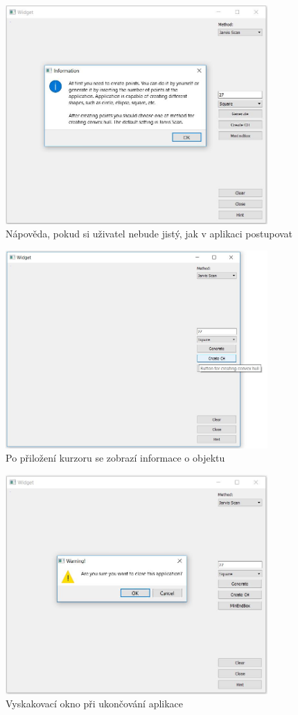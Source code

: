 \documentclass[a4paper, 12pt]{article}
\begin{document}
\begin{figure}[h!]
	\centering
	\includegraphics[width=10cm]{hint.jpg}
	\caption{Nápověda, pokud si uživatel nebude jistý, jak v aplikaci postupovat}
\end{figure}

\begin{figure}[h!]
	\centering
	\includegraphics[width=10cm]{tooltip.jpg}
	\caption{Po přiložení kurzoru se zobrazí informace o objektu}
\end{figure}

\begin{figure}[h!]
	\centering
	\includegraphics[width=10cm]{close.jpg}
	\caption{Vyskakovací okno při ukončování aplikace}
\end{figure}
\end{document}
